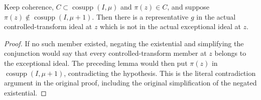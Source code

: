 \begin{lemma}
\label{pub:controlled-member-outside-exceptional}
\leanok
Keep coherence, $C\subset\operatorname{cosupp}(I,\mu)$ and $\pi(z)\in C$,
and suppose $\pi(z)\notin\operatorname{cosupp}(I,\mu+1)$. Then there is a
representative $g$ in the actual controlled-transform ideal at $z$ which is
not in the actual exceptional ideal at $z$.
\end{lemma}
\begin{proof}
If no such member existed, negating the existential and simplifying the
conjunction would say that every controlled-transform member at $z$ belongs
to the exceptional ideal. The preceding lemma would then put $\pi(z)$ in
$\operatorname{cosupp}(I,\mu+1)$, contradicting the hypothesis. This is the
literal contradiction argument in the original proof, including the original
simplification of the negated existential.
\end{proof}
